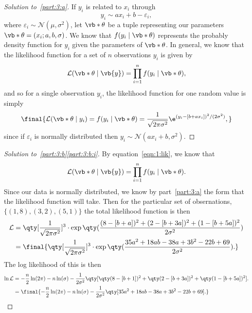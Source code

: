 \documentclass[10pt, physics]{homework}
\begin{document}
	\begin{proof}[Solution to~\ref{part:3:a}]
		If $y_i$ is related to $x_i$ through
		\[ y_i \sim ax_i + b - \varepsilon_i, \]
		where $\varepsilon_i \sim \mathcal{N}(\mu, \sigma^2)$, let $\vb*{\theta}$ be a tuple representing our parameters $\vb*{\theta} = (x_i ;a, b, \sigma)$.
		We know that $f(y_i \mid \vb*{\theta})$ represents the probably density function for $y_i$ given the parameters of $\vb*{\theta}$.
		In general, we know that the likelihood function for a set of $n$ observations $y_i$ is given by
		\begin{equation} 
			\mathcal{L}(\vb*{\theta} \mid \vb{y}) = \prod_{i = 1}^n f(y_i \mid \vb*{\theta}),\label{eqn:1:lik}
		\end{equation}
		and so for a single observation $y_i$, the likelihood function for one random value is simply
		\[ \final{\mathcal{L}(\vb*{\theta} \mid y_i) = f(y_i \mid \vb*{\theta}) = \frac{1}{\sqrt{2\pi\sigma^2}}\e^{(y_i-[b+ax_i])^2/(2\sigma^2)},}\qedhere \]
		since if $\varepsilon_i$ is normally distributed then $y_i \sim \mathcal{N}(ax_i + b, \sigma^2)$.
	\end{proof}
	\begin{proof}[Solution to~\ref{part:3:b}\ref{part:3:b:i}]
		By equation~\eqref{eqn:1:lik}, we know that
		\[
			\mathcal{L}(\vb*{\theta} \mid \vb{y}) = \prod_{i=1}^n f(y_i \mid \vb*{\theta}).
		\]
		Since our data is normally distributed, we know by part~\ref{part:3:a} the form that the likelihood function will take.
		Then for the particular set of obsernations, $\{(1,8),(3,2),(5,1)\}$ the total likelihood function is then
		\begin{align*}
			\mathcal{L} &= \qty[\frac{1}{\sqrt{2\pi\sigma^2}}]^3\cdot\exp\qty(\frac{(8-[b+a])^2 + (2 - [b+3a])^2 + (1 - [b+5a])^2}{2\sigma^2}) \\
			&= \final{\qty[\frac{1}{\sqrt{2\pi\sigma^2}}]^3\cdot\exp\qty(\frac{35 a^2 + 18 a b - 38 a + 3 b^2 - 22 b + 69}{2\sigma^2}).}
		\end{align*}
		The log likelihood of this is then
		\begin{align*}
			\ln\mathcal{L} &= -\frac{n}{2}\ln(2\pi) - n\ln(\sigma) - \frac{1}{2\sigma^2}\qty[\qty(8-[b+1])^2 + \qty(2-[b+3a])^2 + \qty(1 - [b+5a])^2]. \\
			&= \final{-\frac{n}{2}\ln(2\pi) - n\ln(\sigma) - \frac{1}{2\sigma^2}\qty[35 a^2 + 18 a b - 38 a + 3 b^2 - 22 b + 69].}\qedhere
		\end{align*}
	\end{proof}
\end{document}
